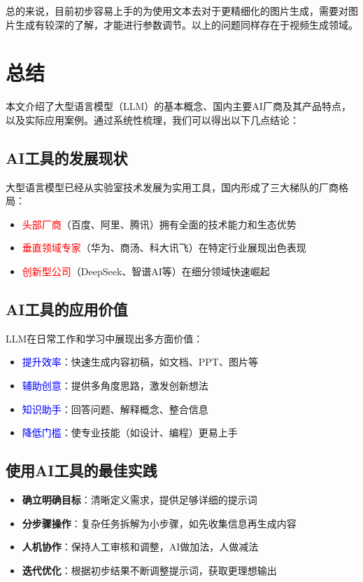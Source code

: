 \documentclass{article}
\begin{document}
总的来说，目前初步容易上手的为使用文本去对于更精细化的图片生成，需要对图片生成有较深的了解，才能进行参数调节。以上的问题同样存在于视频生成领域。

\section{总结}
本文介绍了大型语言模型（LLM）的基本概念、国内主要AI厂商及其产品特点，以及实际应用案例。通过系统性梳理，我们可以得出以下几点结论：

\subsection{AI工具的发展现状}
大型语言模型已经从实验室技术发展为实用工具，国内形成了三大梯队的厂商格局：
\begin{itemize}
  \item \textcolor{red}{头部厂商}（百度、阿里、腾讯）拥有全面的技术能力和生态优势
  \item \textcolor{red}{垂直领域专家}（华为、商汤、科大讯飞）在特定行业展现出色表现
  \item \textcolor{red}{创新型公司}（DeepSeek、智谱AI等）在细分领域快速崛起
\end{itemize}

\subsection{AI工具的应用价值}
LLM在日常工作和学习中展现出多方面价值：
\begin{itemize}
  \item \textcolor{blue}{提升效率}：快速生成内容初稿，如文档、PPT、图片等
  \item \textcolor{blue}{辅助创意}：提供多角度思路，激发创新想法
  \item \textcolor{blue}{知识助手}：回答问题、解释概念、整合信息
  \item \textcolor{blue}{降低门槛}：使专业技能（如设计、编程）更易上手
\end{itemize}

\subsection{使用AI工具的最佳实践}
\begin{itemize}
  \item \textbf{确立明确目标}：清晰定义需求，提供足够详细的提示词
  \item \textbf{分步骤操作}：复杂任务拆解为小步骤，如先收集信息再生成内容
  \item \textbf{人机协作}：保持人工审核和调整，AI做加法，人做减法
  \item \textbf{迭代优化}：根据初步结果不断调整提示词，获取更理想输出
\end{itemize}

% 
% 
\end{document}
